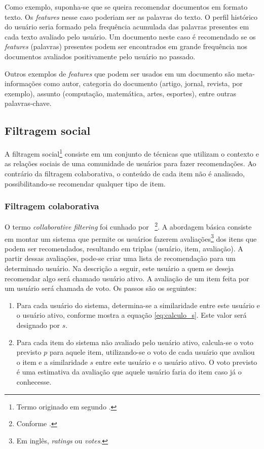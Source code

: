 Como exemplo, suponha-se que se queira recomendar documentos em formato texto. Os \textit{features} nesse caso poderiam ser as palavras do texto. O perfil histórico do usuário seria formado pela frequência acumulada das palavras presentes em cada texto avaliado pelo usuário. Um documento neste caso é recomendado se os \textit{features} (palavras) presentes podem ser encontrados em grande frequência nos documentos avaliados positivamente pelo usuário no passado.

Outros exemplos de \textit{features} que podem ser usados em um documento são meta-informações como autor, categoria do documento (artigo, jornal, revista, por exemplo), assunto (computação, matemática, artes, esportes), entre outras palavras-chave.


\subsection{Filtragem social} %


A filtragem social\footnote{Termo originado em \cite{Malone87} segundo \cite{Hill95}.} consiste em um conjunto de técnicas que utilizam o contexto e as relações sociais de uma comunidade de usuários para fazer recomendações. Ao contrário da filtragem colaborativa, o conteúdo de cada item não é analisado, possibilitando-se recomendar qualquer tipo de item.

\subsubsection{Filtragem colaborativa}

O termo \textit{collaborative filtering} foi cunhado por \cite{Goldberg92}~\footnote{Conforme \cite{Resnick97}.}. A abordagem básica consiste em montar um sistema que permite os usuários fazerem avaliações\footnote{Em inglês, \textit{ratings} ou \textit{votes}.} dos itens que podem ser recomendados, resultando em triplas (usuário, item, avaliação). A partir dessas avaliações, pode-se criar uma lista de recomendação para um determinado usuário. Na descrição a seguir, este usuário a quem se deseja recomendar algo será chamado usuário ativo. A avaliação de um item feita por um usuário será chamada de voto. Os passos são os seguintes:

\begin{enumerate}
\item 
Para cada usuário do sistema, determina-se a similaridade entre este usuário e o usuário ativo, conforme mostra a equação \ref{eq:calculo_s}. Este valor será designado por $s$.

\item Para cada item do sistema não avaliado pelo usuário ativo, calcula-se o voto previsto $p$ para aquele item, utilizando-se o voto de cada usuário que avaliou o item e a similaridade $s$ entre este usuário e o usuário ativo. O voto previsto é uma estimativa da avaliação que aquele usuário faria do item caso já o conhecesse.
\end{enumerate}

